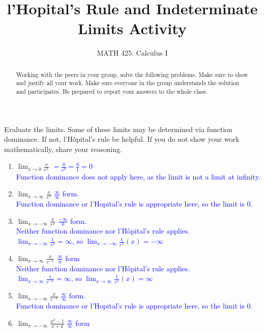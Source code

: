 \documentclass{ximera}
\title{l'Hopital's Rule and Indeterminate Limits Activity}
\author{MATH 425: Calculus I}
\begin{document}
\begin{abstract}
   Working with the peers in your group, solve the following problems. Make sure to show and justify all your work. Make sure everyone in the group understands the solution and participates. Be prepared to report your answers to the whole class. 
\end{abstract}
\maketitle


\begin{exercise}
    Evaluate the limits.  Some of these limits may be determined via function dominance.  If not, l'H\^opital's rule  be helpful.  If you do not show your work mathematically, share your reasoning.
\begin{enumerate}
    \item $\lim_{x\rightarrow 0} \frac{x}{e^x}$ \textcolor{blue}{ $=\frac{0}{e^0}=\frac01=0$ \\
Function dominance does not apply here, as the limit is not a limit at infinity.}
    \item $\lim_{x\rightarrow \infty} \frac{x}{e^x}$ \textcolor{blue}{ $\frac{\infty}{\infty}$ form.\\
    Function dominance or l'Hopital's rule is appropriate here, so the limit is $0$.}
    \item $\lim_{x\rightarrow -\infty} \frac{x}{e^x}$ \textcolor{blue}{ $\frac{-\infty}{0}$ form.\\
    Neither function dominance nor l'H\^opital's rule applies.\\
    $\lim_{x\rightarrow -\infty}\frac{1}{e^{x}}=\infty$, so $\lim_{x\rightarrow -\infty}\frac{1}{e^x}(x)=-\infty$  }
     \item $\lim_{x\rightarrow \infty} \frac{x}{e^{-x}}$ \textcolor{blue}{ $\frac{\infty}{0}$ form\\
     Neither function dominance nor l'H\^opital's rule applies.\\
     $\lim_{x\rightarrow \infty}\frac{1}{e^{-x}}=\infty$, so $\lim_{x\rightarrow \infty}\frac{1}{e^x}(x)=\infty$ }
    \item $\lim_{x\rightarrow -\infty} \frac{x}{e^{-x}}$ \textcolor{blue}{ $\frac{\infty}{\infty}$ form.\\
    Function dominance or l'Hopital's rule is appropriate here, so the limit is $0$.}
    \item $\lim_{x\rightarrow -\infty} \frac{x^2-1}{x+4}$ \textcolor{blue}{ $\frac{\infty}{\infty}$ form\\
}
\end{enumerate}
\end{exercise}
\end{document}
